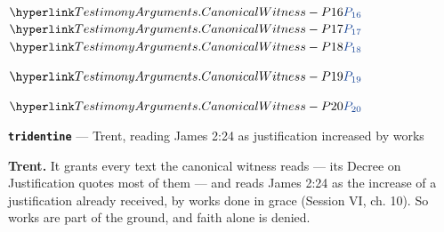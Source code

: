 \documentclass[11pt,paper=\testimonypaper,DIV=13,parskip=false]{scrartcl}
\begin{document}
\begin{derivation}
   \(\pvar{TestimonyArguments.CanonicalWitness}{16}\)
   \(\pvar{TestimonyArguments.CanonicalWitness}{17}\)
   \(\pvar{TestimonyArguments.CanonicalWitness}{18}\)
  \item[(19)] \(\pvar{TestimonyArguments.CanonicalWitness}{19}\)
  \item[(20)] \(\pvar{TestimonyArguments.CanonicalWitness}{20}\)
\end{derivation}
\par\medskip\noindent\textbf{\texttt{tridentine}} --- Trent, reading James 2:24 as justification increased by works\par\nobreak\noindent
\textbf{Trent.} It grants every text the canonical witness reads — its Decree on Justification quotes most of them — and reads James 2:24 as the increase of a justification already received, by works done in grace (Session VI, ch. 10). So works are part of the ground, and faith alone is denied.
\end{document}
